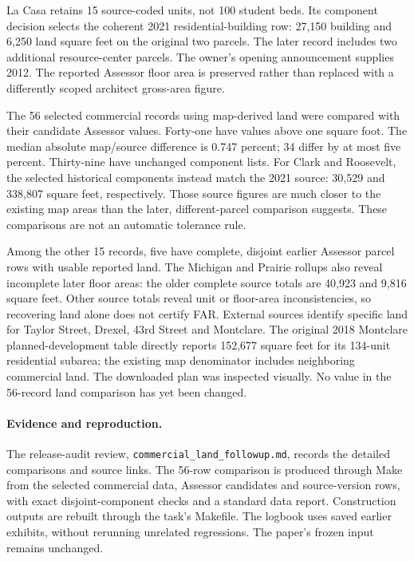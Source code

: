 La Casa retains 15 source-coded units, not 100 student beds. Its component decision selects the coherent 2021 residential-building row: 27,150 building and 6,250 land square feet on the original two parcels. The later record includes two additional resource-center parcels. The owner's opening announcement supplies 2012. The reported Assessor floor area is preserved rather than replaced with a differently scoped architect gross-area figure.

The 56 selected commercial records using map-derived land were compared with their candidate Assessor values. Forty-one have values above one square foot. The median absolute map/source difference is 0.747 percent; 34 differ by at most five percent. Thirty-nine have unchanged component lists. For Clark and Roosevelt, the selected historical components instead match the 2021 source: 30,529 and 338,807 square feet, respectively. Those source figures are much closer to the existing map areas than the later, different-parcel comparison suggests. These comparisons are not an automatic tolerance rule.

Among the other 15 records, five have complete, disjoint earlier Assessor parcel rows with usable reported land. The Michigan and Prairie rollups also reveal incomplete later floor areas: the older complete source totals are 40,923 and 9,816 square feet. Other source totals reveal unit or floor-area inconsistencies, so recovering land alone does not certify FAR. External sources identify specific land for Taylor Street, Drexel, 43rd Street and Montclare. The original 2018 Montclare planned-development table directly reports 152,677 square feet for its 134-unit residential subarea; the existing map denominator includes neighboring commercial land. The downloaded plan was inspected visually. No value in the 56-record land comparison has yet been changed.

\paragraph{Evidence and reproduction.}
The release-audit review, \texttt{commercial\_land\_followup.md}, records the detailed comparisons and source links.
The 56-row comparison is produced through Make from the selected commercial data,
Assessor candidates and source-version rows, with exact disjoint-component checks
and a standard data report. Construction outputs are rebuilt through the task's
Makefile. The logbook uses saved earlier exhibits, without rerunning unrelated
regressions. The paper's frozen input remains unchanged.
